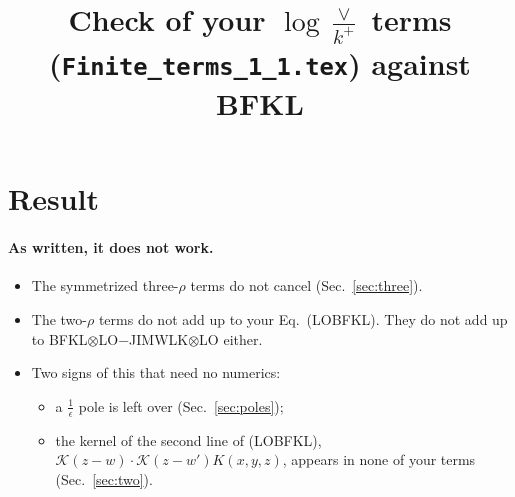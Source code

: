 \documentclass[10pt]{article}
\title{Check of your $\log\frac{\vee}{k^+}$ terms (\texttt{Finite\_terms\_1\_1.tex}) against BFKL}
\date{}
\numberwithin{equation}{section}
\newcommand{\KK}{\mathcal K}
\begin{document}
\maketitle
\tableofcontents

\section{Result}\label{sec:result}
\paragraph{As written, it does not work.}
\begin{itemize}
\item The symmetrized three-$\rho$ terms do not cancel (Sec.~\ref{sec:three}).
\item The two-$\rho$ terms do not add up to your Eq.~(LOBFKL). They do not add up to BFKL$\otimes$LO$-$JIMWLK$\otimes$LO either.
\item Two signs of this that need no numerics:
\begin{itemize}
\item a $\frac1\epsilon$ pole is left over (Sec.~\ref{sec:poles});
\item the kernel of the second line of (LOBFKL), $\KK(z-w)\cdot\KK(z-w')K(x,y,z)$, appears in none of your terms (Sec.~\ref{sec:two}).
\end{itemize}
\end{itemize}
\end{document}
